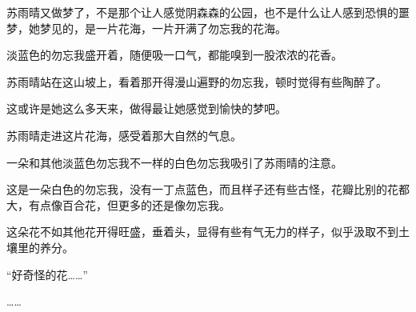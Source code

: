 苏雨晴又做梦了，不是那个让人感觉阴森森的公园，也不是什么让人感到恐惧的噩梦，她梦见的，是一片花海，一片开满了勿忘我的花海。

淡蓝色的勿忘我盛开着，随便吸一口气，都能嗅到一股浓浓的花香。

苏雨晴站在这山坡上，看着那开得漫山遍野的勿忘我，顿时觉得有些陶醉了。

这或许是她这么多天来，做得最让她感觉到愉快的梦吧。

苏雨晴走进这片花海，感受着那大自然的气息。

一朵和其他淡蓝色勿忘我不一样的白色勿忘我吸引了苏雨晴的注意。

这是一朵白色的勿忘我，没有一丁点蓝色，而且样子还有些古怪，花瓣比别的花都大，有点像百合花，但更多的还是像勿忘我。

这朵花不如其他花开得旺盛，垂着头，显得有些有气无力的样子，似乎汲取不到土壤里的养分。

“好奇怪的花……”

……
